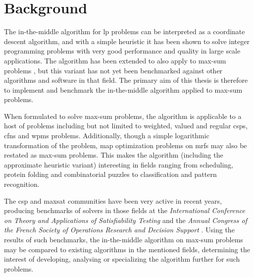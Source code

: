 \section{Background}
The in-the-middle algorithm \parencite{Wedelin95} for \gls{lp} problems can be interpreted as a coordinate descent algorithm, and with a simple heuristic it has been shown to solve integer programming problems with very good performance and quality in large scale applications.
The algorithm has been extended to also apply to max-sum problems \parencites{Wedelin08}{Wedelin13}, but this variant has not yet been benchmarked against other algorithms and software in that field.
The primary aim of this thesis is therefore to implement and benchmark the in-the-middle algorithm applied to max-sum problems.

When formulated to solve max-sum problems, the algorithm is applicable to a host of problems including but not limited to weighted, valued and regular \glspl{csp}, \glspl{cfn} and \gls{wpms} problems.
Additionally, though a simple logarithmic transformation of the problem, \gls{map} optimization problems on \glspl{mrf} may also be restated as max-sum problems.
This makes the algorithm (including the approximate heuristic variant) interesting in fields ranging from scheduling, protein folding and combinatorial puzzles to classification and pattern recognition.

The \gls{csp} and \gls{maxsat} communities have been very active in recent years, producing benchmarks of solvers in those fields at the \emph{International Conference on Theory and Applications of Satisfiability Testing} \parencite{Argelich11} and the \emph{Annual Congress of the French Society of Operations Research and Decision Support} \parencite{Allouche14b}.
Using the results of such benchmarks, the in-the-middle algorithm on max-sum problems may be compared to existing algorithms in the mentioned fields, determining the interest of developing, analysing or specializing the algorithm further for such problems.
